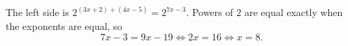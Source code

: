 The left side is $2^{(3x+2)+(4x-5)}=2^{7x-3}$. Powers of $2$ are equal exactly when the exponents are equal, so
\[7x-3=9x-19\iff 2x=16\iff x=\boxed{8}.\]

